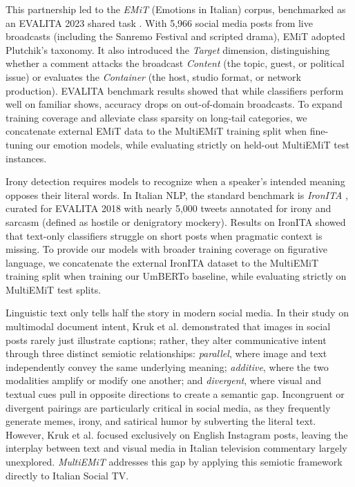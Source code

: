 This partnership led to the \textit{EMiT} (Emotions in Italian) corpus, benchmarked as an EVALITA 2023 shared task \cite{emit}. With 5,966 social media posts from live broadcasts (including the Sanremo Festival and scripted drama), EMiT adopted Plutchik's taxonomy. It also introduced the \textit{Target} dimension, distinguishing whether a comment attacks the broadcast \textit{Content} (the topic, guest, or political issue) or evaluates the \textit{Container} (the host, studio format, or network production). EVALITA benchmark results showed that while classifiers perform well on familiar shows, accuracy drops on out-of-domain broadcasts. To expand training coverage and alleviate class sparsity on long-tail categories, we concatenate external EMiT data to the MultiEMiT training split when fine-tuning our emotion models, while evaluating strictly on held-out MultiEMiT test instances.

Irony detection requires models to recognize when a speaker's intended meaning opposes their literal words. In Italian NLP, the standard benchmark is \textit{IronITA} \cite{ironita2018}, curated for EVALITA 2018 with nearly 5,000 tweets annotated for irony and sarcasm (defined as hostile or denigratory mockery). Results on IronITA showed that text-only classifiers struggle on short posts when pragmatic context is missing. To provide our models with broader training coverage on figurative language, we concatenate the external IronITA dataset to the MultiEMiT training split when training our UmBERTo baseline, while evaluating strictly on MultiEMiT test splits.

Linguistic text only tells half the story in modern social media. In their study on multimodal document intent, Kruk et al. \cite{MultiM} demonstrated that images in social posts rarely just illustrate captions; rather, they alter communicative intent through three distinct semiotic relationships: \textit{parallel}, where image and text independently convey the same underlying meaning; \textit{additive}, where the two modalities amplify or modify one another; and \textit{divergent}, where visual and textual cues pull in opposite directions to create a semantic gap. Incongruent or divergent pairings are particularly critical in social media, as they frequently generate memes, irony, and satirical humor by subverting the literal text. However, Kruk et al. focused exclusively on English Instagram posts, leaving the interplay between text and visual media in Italian television commentary largely unexplored. \textit{MultiEMiT} addresses this gap by applying this semiotic framework directly to Italian Social TV.
